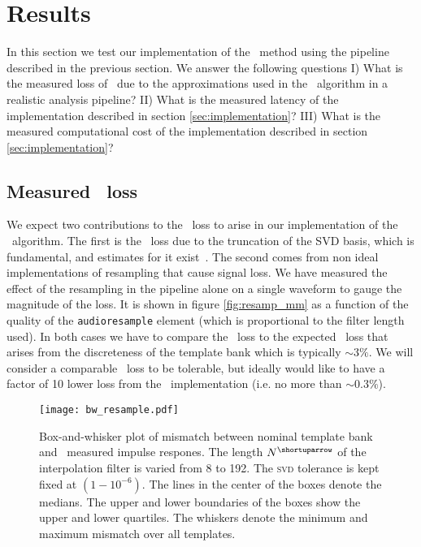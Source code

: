 \section{Results}
\label{SECIV}\label{sec:results}

In this section we test our implementation of the \lloid\ method using the
pipeline described in the previous section.  We answer the following questions
%
I) What is the measured loss of \SNR\ due to the approximations used in the
\lloid\ algorithm in a realistic analysis pipeline?
%
II) What is the measured latency of the implementation described in section
\ref{sec:implementation}?
%
III) What is the measured computational cost of the implementation described in
section \ref{sec:implementation}?

\subsection{Measured \SNR\ loss}

We expect two contributions to the \SNR\ loss to arise in our implementation of
the \lloid\ algorithm.  The first is the \SNR\ loss due to the truncation of
the SVD basis, which is fundamental, and estimates for it
exist~\cite{Cannon:2010p10398}.  The second comes from non ideal
implementations of resampling that cause signal loss.  We have measured the
effect of the resampling in the pipeline alone on a single waveform to gauge
the magnitude of the loss.  It is shown in figure \ref{fig:resamp_mm} as a
function of the quality of the {\tt audioresample} element (which is
proportional to the filter length used).  In both cases we have to compare the
\SNR\ loss to the expected \SNR\ loss that arises from the discreteness of the
template bank which is typically $\sim 3\%$.  We will consider a comparable
\SNR\ loss to be tolerable, but ideally would like to have a factor of 10 lower
loss from the \lloid\ implementation (i.e. no more than $\sim 0.3 \%$).  
%
\begin{figure}
	\label{fig:hist-interpolate}
	\begin{center}
		\texttt{[image: bw\_resample.pdf]}
		\caption{Box-and-whisker plot of mismatch between nominal template bank and \lloid\ measured impulse respones.  The length $N^\shortuparrow$ of the interpolation filter is varied from 8 to 192.  The \textsc{svd} tolerance is kept fixed at $(1-10^{-6})$.  The lines in the center of the boxes denote the medians.  The upper and lower boundaries of the boxes show the upper and lower quartiles.  The whiskers denote the minimum and maximum mismatch over all templates.}
	\end{center}
\end{figure}


